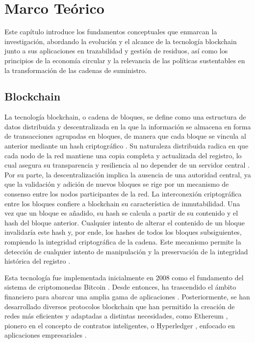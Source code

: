 \chapter[Marco Teórico]{Marco Teórico}
\label{cp:theoretical-framework}

\parindent0pt


\noindent Este capítulo introduce los fundamentos conceptuales que enmarcan la investigación, abordando la evolución y el alcance de la tecnología blockchain junto a sus aplicaciones en trazabilidad y gestión de residuos, así como los principios de la economía circular y la relevancia de las políticas sustentables en la transformación de las cadenas de suministro.


\section{Blockchain}

La tecnología blockchain, o cadena de bloques, se define como una estructura de datos distribuida y descentralizada en la que la información se almacena en forma de transacciones agrupadas en bloques, de manera que cada bloque se vincula al anterior mediante un hash criptográfico \cite{tripathi2023comprehensive}. Su naturaleza distribuida radica en que cada nodo de la red mantiene una copia completa y actualizada del registro, lo cual asegura su transparencia y resiliencia al no depender de un servidor central \cite{bulkowska2023implementation}. Por su parte, la descentralización implica la ausencia de una autoridad central, ya que la validación y adición de nuevos bloques se rige por un mecanismo de consenso entre los nodos participantes de la red. La interconexión criptográfica entre los bloques confiere a blockchain su característica de inmutabilidad. Una vez que un bloque es añadido, su hash se calcula a partir de su contenido y el hash del bloque anterior. Cualquier intento de alterar el contenido de un bloque invalidaría este hash y, por ende, los hashes de todos los bloques subsiguientes, rompiendo la integridad criptográfica de la cadena. Este mecanismo permite la detección de cualquier intento de manipulación y la preservación de la integridad histórica del registro \cite{bulkowska2023implementation}.

Esta tecnología fue implementada inicialmente en 2008 como el fundamento del sistema de criptomonedas Bitcoin \cite{satoshi2008bitcoin}. Desde entonces, ha trascendido el ámbito financiero para abarcar una amplia gama de aplicaciones \cite{bartolomeo2020introduccion}. Posteriormente, se han desarrollado diversos protocolos blockchain que han permitido la creación de redes más eficientes y adaptadas a distintas necesidades, como Ethereum \cite{buterin2013ethereum}, pionero en el concepto de contratos inteligentes, o Hyperledger \cite{androulaki2018hyperledger}, enfocado en aplicaciones empresariales \cite{sunny2022systematic, rennock2018blockchain}.

